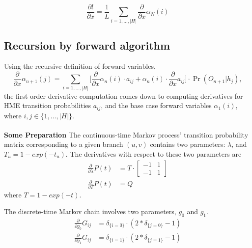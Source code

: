 \documentclass[11pt]{article}
\begin{document}
$$\frac{\partial l}{\partial x}
= \frac{1}{L}\sum_{i=1,\ldots, |H|}\frac{\partial }{\partial x} \alpha_{N}(i) $$


\subsection*{Recursion by forward algorithm}
Using the recursive definition of forward variables,
$$\frac{\partial }{\partial x} \alpha_{n+1}(j) =
\sum_{i=1,\ldots, |H|} \big[\frac{\partial }{\partial x}\alpha_n(i) \cdot a_{ij} +\alpha_n(i)\cdot \frac{\partial }{\partial x}a_{ij} \big] \cdot \Pr(O_{n+1}|h_j), $$
the first order derivative computation comes down to computing
derivatives for HME transition probabilities $a_{ij}$, and the base case
forward variables $\alpha_1(i)$, where $i, j \in \{1, \ldots, |H|\}$.
\\
\\
\noindent\textbf{Some Preparation}
The continuous-time Markov process' transition probability matrix
corresponding to a given branch $(u,v)$ contains two parameters:
$\lambda$, and $T_u=1-exp(-t_u)$. The derivatives with respect to
these two parameters are
\begin{equation}
\begin{aligned}
\frac{\partial}{\partial \lambda} P(t)
&= T\cdot\begin{bmatrix}
  -1 & 1 \\[0.3em]
  -1 & 1
\end{bmatrix}\\
\frac{\partial}{\partial T} P(t) &= Q
\end{aligned}
\end{equation}
where $T = 1-exp(-t)$.


The discrete-time Markov chain involves two parameters, $g_0$ and $g_1$.
\begin{equation}
\begin{aligned}
\frac{\partial}{\partial g_0} G_{ij} &= \delta_{\{i=0\}}\cdot (2*\delta_{\{j=0\}}-1)\\
\frac{\partial}{\partial g_1} G_{ij} &= \delta_{\{i=1\}}\cdot (2*\delta_{\{j=1\}}-1)
\end{aligned}
\end{equation}
\end{document}
